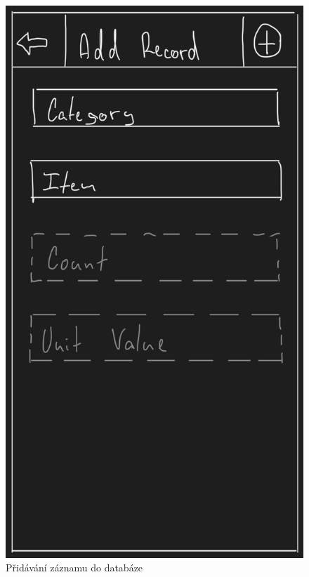 \documentclass[12pt, titlepage]{article}
\begin{document}
\begin{figure}[ht]
	\centering
	\includegraphics[scale=0.43]{add_record}
	\caption{Přidávání záznamu do databáze}
	\label{fig:add_record}
\end{figure}
\end{document}
